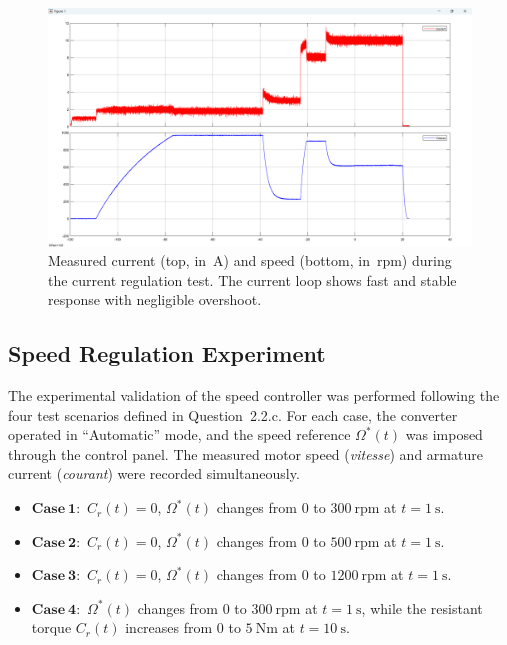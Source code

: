 \documentclass{rapportCS}
\begin{document}
\begin{figure}[H]
    \centering
    \includegraphics[width=\linewidth, keepaspectratio]{figures/PP1.png}
    \caption{Measured current (top, in~A) and speed (bottom, in~rpm) during the current regulation test. 
    The current loop shows fast and stable response with negligible overshoot.}
    \label{fig:exp_I_20A}
\end{figure}


\subsection{Speed Regulation Experiment}

The experimental validation of the speed controller was performed following the four test scenarios defined in Question~2.2.c. 
For each case, the converter operated in ``Automatic'' mode, and the speed reference $\Omega^*(t)$ was imposed through the control panel. 
The measured motor speed (\textit{vitesse}) and armature current (\textit{courant}) were recorded simultaneously.

\begin{itemize}
    \item $\mathbf{Case~1:}$ $C_r(t)=0$, $\Omega^*(t)$ changes from $0$ to $300~\text{rpm}$ at $t=1~\text{s}$.
    \item $\mathbf{Case~2:}$ $C_r(t)=0$, $\Omega^*(t)$ changes from $0$ to $500~\text{rpm}$ at $t=1~\text{s}$.
    \item $\mathbf{Case~3:}$ $C_r(t)=0$, $\Omega^*(t)$ changes from $0$ to $1200~\text{rpm}$ at $t=1~\text{s}$.
    \item $\mathbf{Case~4:}$ $\Omega^*(t)$ changes from $0$ to $300~\text{rpm}$ at $t=1~\text{s}$, while the resistant torque $C_r(t)$ increases from $0$ to $5~\text{Nm}$ at $t=10~\text{s}$.
\end{itemize}
\end{document}
